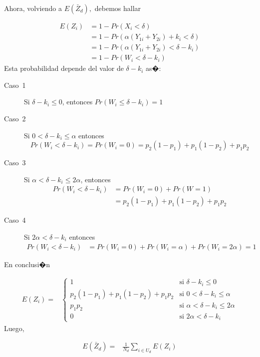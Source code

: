 \documentclass[english]{article}
\begin{document}
Ahora, volviendo a $E\left(\bar{Z}_{d}\right),$ debemos hallar 

\begin{align*}
E\left(Z_{i}\right) & =1-Pr\left(X_{i}<\delta\right)\\
 & =1-Pr\left(\alpha\left(Y_{1i}+Y_{2i}\right)+k_{i}<\delta\right)\\
 & =1-Pr\left(\alpha\left(Y_{1i}+Y_{2i}\right)<\delta-k_{i}\right)\\
 & =1-Pr\left(W_{i}<\delta-k_{i}\right)
\end{align*}
Esta probabilidad depende del valor de $\delta-k_{i}$ as�:
\begin{description}
\item [{Caso~1}] Si $\delta-k_{i}\le0$, entonces $Pr\left(W_{i}\le\delta-k_{i}\right)=1$
\item [{Caso~2}] Si $0<\delta-k_{i}\le\alpha$ entonces 
\[
Pr\left(W_{i}<\delta-k_{i}\right)=Pr\left(W_{i}=0\right)=p_{2}\left(1-p_{1}\right)+p_{1}\left(1-p_{2}\right)+p_{1}p_{2}
\]
\item [{Caso~3}] Si $\alpha<\delta-k_{i}\le2\alpha$, entonces 
\begin{align*}
Pr\left(W_{i}<\delta-k_{i}\right) & =Pr\left(W_{i}=0\right)+Pr\left(W=1\right)\\
 & =p_{2}\left(1-p_{1}\right)+p_{1}\left(1-p_{2}\right)+p_{1}p_{2}
\end{align*}
\item [{Caso~4}] Si $2\alpha<\delta-k_{i}$ entonces
\begin{align*}
Pr\left(W_{i}<\delta-k_{i}\right) & =Pr\left(W_{i}=0\right)+Pr\left(W_{i}=\alpha\right)+Pr\left(W_{i}=2\alpha\right)=1
\end{align*}
\end{description}
En conclusi�n 

\begin{align*}
E\left(Z_{i}\right)= & \begin{cases}
1 & \text{si }\delta-k_{i}\le0\\
p_{2}\left(1-p_{1}\right)+p_{1}\left(1-p_{2}\right)+p_{1}p_{2} & \text{si }0<\delta-k_{i}\le\alpha\\
p_{1}p_{2} & \text{si }\alpha<\delta-k_{i}\le2\alpha\\
0 & \text{si }2\alpha<\delta-k_{i}
\end{cases}
\end{align*}
Luego, 

\begin{align*}
E\left(\bar{Z}_{d}\right)= & \frac{1}{N_{d}}\sum_{i\in U_{d}}E\left(Z_{i}\right)
\end{align*}
\end{document}
